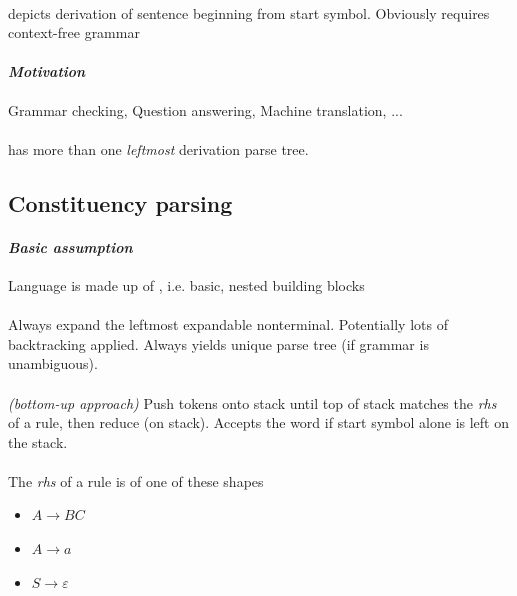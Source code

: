 \documentclass[10pt,twocolumn]{article}
\begin{document}
\paragraph{} depicts derivation of sentence beginning from start
symbol. Obviously requires context-free grammar 

\paragraph{\textit{Motivation}} Grammar checking, Question answering, Machine
translation, ...

\paragraph{} has more than one \textit{leftmost}
derivation parse tree.

\subsection{Constituency parsing}

\paragraph{\textit{Basic assumption}} Language is made up of ,
i.e. basic, nested building blocks 

\paragraph{}  Always expand the leftmost expandable
nonterminal. Potentially lots of backtracking applied. Always yields unique
parse tree (if grammar is unambiguous).

\paragraph{} \textit{(bottom-up approach)} Push tokens
onto stack until top of stack matches the \textit{rhs} of a rule, then reduce
(on stack). Accepts the word if start symbol alone is left on the stack.

\paragraph{} The \textit{rhs} of a rule is of one of
these shapes
\begin{itemize}
\item $A \rightarrow BC$
\item $A \rightarrow a$
\item $S \rightarrow \varepsilon$
\end{itemize}
\end{document}

